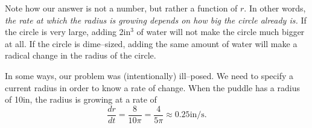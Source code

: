 {\begin{enumerate}
Note how our answer is not a number, but rather a function of $r$. In other words, \textit{the rate at which the radius is growing depends on how big the circle already is.} If the circle is very large, adding 2in$^3$ of water will not make the circle much bigger at all. If the circle is dime--sized, adding the same amount of water will make a radical change in the radius of the circle.

In some ways, our problem was (intentionally) ill--posed. We need to specify a current radius in order to know a rate of change. When the puddle has a radius of 10in, the radius is growing at a rate of $$
\frac{dr}{dt} = \frac{8}{10\pi} = \frac{4}{5\pi} \approx 0.25\text{in/s}.$$
 
\end{enumerate}
\baselineskip
}\\

